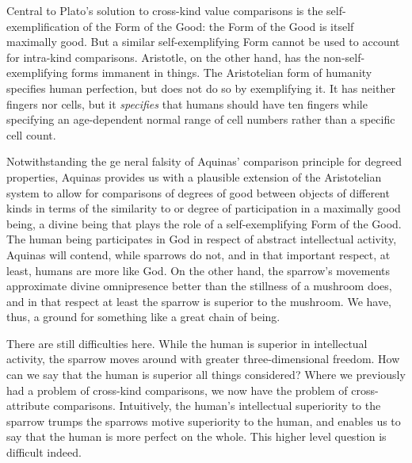 Central to Plato's solution to cross-kind value comparisons is the self-exemplification of the Form of the Good:
the Form of the Good is itself maximally good. But a similar self-exemplifying Form cannot be used to account for
intra-kind comparisons. Aristotle, on the other hand, has the non-self-exemplifying forms immanent in things. 
The Aristotelian form of humanity specifies human perfection, but does not do so by exemplifying it. It has neither
fingers nor cells, but it \textit{specifies} that humans should have ten fingers while specifying an age-dependent
normal range of cell numbers rather than a specific cell count.

Notwithstanding the ge neral falsity of Aquinas' comparison principle for degreed properties, Aquinas provides us
with a plausible extension of the Aristotelian system to allow for comparisons of degrees of good between objects
of different kinds in terms of the similarity to or degree of participation in a maximally good being, a divine being
that plays the role of a self-exemplifying Form of the Good. The human being participates in God in respect of
abstract intellectual activity, Aquinas will contend, while sparrows do not, and in that important respect, at least,
humans are more like God. On the other hand, the sparrow's movements approximate divine omnipresence better than 
the stillness of a mushroom does, and in that respect at least the sparrow is superior to the mushroom. We have,
thus, a ground for something like a great chain of being.

There are still difficulties here. While the human is superior in intellectual activity, the sparrow moves around
with greater three-dimensional freedom. How can we say that the human is superior all things considered? Where we
previously had a problem of cross-kind comparisons, we now have the problem of cross-attribute comparisons. 
Intuitively, the human's intellectual superiority to the sparrow trumps the sparrows motive superiority to the
human, and enables us to say that the human is more perfect on the whole. This higher level question is difficult
indeed. 

